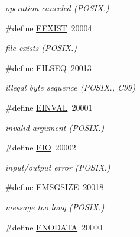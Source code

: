 \begin{DoxyCompactItemize}
\begin{DoxyCompactList}\small\item\em operation canceled (P\-O\-S\-I\-X.) \end{DoxyCompactList}\item 
\hypertarget{group__hal_ga0a3bef9e5c47e42917692b5dae3b5498}{\#define \hyperlink{group__hal_ga0a3bef9e5c47e42917692b5dae3b5498}{E\-E\-X\-I\-S\-T}~20004}\label{group__hal_ga0a3bef9e5c47e42917692b5dae3b5498}

\begin{DoxyCompactList}\small\item\em file exists (P\-O\-S\-I\-X.) \end{DoxyCompactList}\item 
\hypertarget{group__hal_gac6c071293826a4e66a717bb38db7794d}{\#define \hyperlink{group__hal_gac6c071293826a4e66a717bb38db7794d}{E\-I\-L\-S\-E\-Q}~20013}\label{group__hal_gac6c071293826a4e66a717bb38db7794d}

\begin{DoxyCompactList}\small\item\em illegal byte sequence (P\-O\-S\-I\-X., C99) \end{DoxyCompactList}\item 
\hypertarget{group__hal_ga2d1678d5a7cc8ce499643f3b8957def4}{\#define \hyperlink{group__hal_ga2d1678d5a7cc8ce499643f3b8957def4}{E\-I\-N\-V\-A\-L}~20001}\label{group__hal_ga2d1678d5a7cc8ce499643f3b8957def4}

\begin{DoxyCompactList}\small\item\em invalid argument (P\-O\-S\-I\-X.) \end{DoxyCompactList}\item 
\hypertarget{group__hal_ga70979f50f9c83e5aebab3d6a1bd4cf35}{\#define \hyperlink{group__hal_ga70979f50f9c83e5aebab3d6a1bd4cf35}{E\-I\-O}~20002}\label{group__hal_ga70979f50f9c83e5aebab3d6a1bd4cf35}

\begin{DoxyCompactList}\small\item\em input/output error (P\-O\-S\-I\-X.) \end{DoxyCompactList}\item 
\hypertarget{group__hal_gae37becfaa095a9df5c5c788bce5aa06f}{\#define \hyperlink{group__hal_gae37becfaa095a9df5c5c788bce5aa06f}{E\-M\-S\-G\-S\-I\-Z\-E}~20018}\label{group__hal_gae37becfaa095a9df5c5c788bce5aa06f}

\begin{DoxyCompactList}\small\item\em message too long (P\-O\-S\-I\-X.) \end{DoxyCompactList}\item 
\hypertarget{group__hal_ga0030614bc864d1b24eaedd71585acc27}{\#define \hyperlink{group__hal_ga0030614bc864d1b24eaedd71585acc27}{E\-N\-O\-D\-A\-T\-A}~20000}\label{group__hal_ga0030614bc864d1b24eaedd71585acc27}


\end{DoxyCompactItemize}
